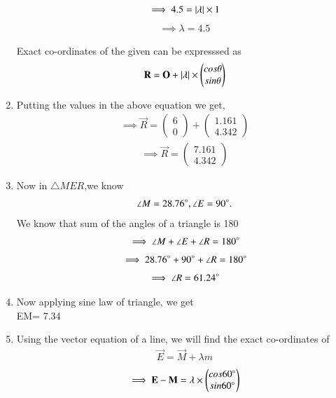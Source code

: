 \documentclass[journal,12pt,twocolumn]{IEEEtran}
\newcommand{\myvec}[1]{\ensuremath{\begin{pmatrix}#1\end{pmatrix}}}
\begin{document}
\begin{enumerate}
\begin{align}
\end{align}
\begin{align}
   \implies 4.5= \vert\lambda\vert \times 1
\end{align}
\begin{align}
    \implies \lambda = 4.5
\end{align}
\begin{lemma}
Exact co-ordinates of the given  can be expresssed as
\begin{align}
 \vec{R}= \vec{O}+ \abs{\lambda}\times \myvec{cos\theta\\sin\theta}
 \end{align}
 \end{lemma}
 \item Putting the values in the above equation we get,
 \begin{align}
     \implies \vec{R}= \myvec{6\\0}+\myvec{1.161\\4.342}
 \end{align}
 \begin{align}
    \implies  \vec{R}= \myvec{7.161\\4.342}
 \end{align}
 \item Now in $\triangle MER$,we know
 \begin{align}
 \angle M=28.76\degree, \angle E=90\degree.
  \end{align}
  We know that sum of the angles of a triangle is 180\degree
 \begin{align}
     \implies \angle M+ \angle E+ \angle R= 180\degree
 \end{align}
 \begin{align}
     \implies 28.76\degree+90\degree+\angle R= 180\degree
 \end{align}
 \begin{align}
 \implies \angle R=61.24\degree
 \end{align}
 \item Now applying sine law of triangle, we get \\
 EM= 7.34\\
\item Using the vector equation of a line, we will find the exact co-ordinates of  
 \begin{align}
     \vec{E}= \vec{M}+ \lambda m
 \end{align}
 \begin{align}
     \implies  \vec{E}-\vec{M}= \lambda \times \myvec{cos60\degree\\sin60\degree}

\end{align}
\end{enumerate}
\end{document}
